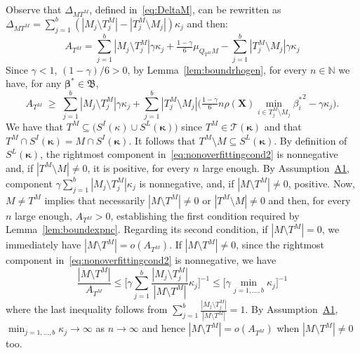 \documentclass[
  12pt]{article}
\newcommand{\N}{\mathbb{N}}
\newcommand{\T}{\mathcal{T}}
\newcommand{\bbeta}{\boldsymbol{\beta}}
\newcommand{\bX}{\mathbf{X}}
\newcommand{\bB}{\mathfrak{B}}
\newcommand{\bkappa}{\boldsymbol{\kappa}}
\begin{document}
Observe that $\Delta_{MT^M}$, defined in~\eqref{eq:DeltaM}, can be rewritten as $\Delta_{MT^M}=\sum_{j=1}^b(|M_j\setminus T^M_j|-|T^M_j\setminus M_j|)\kappa_j$ and then:
$$ A_{T^M}=\sum_{j=1}^b|M_j\setminus T^M_j|\gamma\kappa_j+\tfrac{1-\gamma}{6}\mu_{Q_{T^M}M}-\sum_{j=1}^b|T^M_j\setminus M_j|\gamma\kappa_j $$
Since $\gamma <1$, $(1-\gamma)/6 >0$, by  Lemma~\ref{lem:boundrhogen}, for every $n\in \N$ we have, for any $\bbeta^*\in \bB$,
\begin{equation}\label{eq:nonoverfittingcond2}
   A_{T^M}\;\geq\; \sum_{j=1}^b|M_j \setminus T^M_j|\gamma\kappa_j + \sum_{j=1}^b |T^M_j\setminus M_j |\Big(\tfrac{1-\gamma}{6} n \rho(\bX) \min_{i\in T^M_j\setminus M_j}{\beta^*_i}^{2} - \gamma\kappa_j\Big).
\end{equation} 
We have that $T^M\subseteq \big(S^I(\kappa) \cup S^L(\bkappa)\big)$ since $T^M\in\T(\bkappa)$ and that $T^M\cap S^{I}(\bkappa) = M\cap S^{I}(\bkappa)$. It follows that $T^M\setminus M \subseteq S^L(\bkappa)$. By definition of $S^L(\bkappa)$, the rightmost component in~\eqref{eq:nonoverfittingcond2} is nonnegative and, if $|T^M\setminus M|\neq0$, it is positive, for every $n$ large enough. By Assumption~\hyperlink{lab:A1}{A1}, component $\gamma\sum_{j=1}^b|M_j \setminus T^M_j|\kappa_j$ is nonnegative, and, if $|M\setminus T^M|\neq0$, positive. Now, $M\neq T^M$ implies that necessarily $|M\setminus T^M|\neq0$ or $|T^M\setminus M|\neq0$ and then, for every $n$ large enough, $A_{T^M}>0$, establishing the first condition required by Lemma~\ref{lem:boundexpnc}. Regarding its second condition, if $|M\setminus T^M|=0$, we immediately have $|M\setminus T^M|=o(A_{T^M})$. If $|M\setminus T^M|\neq 0$, since the rightmost component in~\eqref{eq:nonoverfittingcond2} is nonnegative, we have
$$\frac{|M\setminus T^M|}{A_{T^M}}\leq \bigg[ \gamma\sum_{j=1}^b\frac{|M_j \setminus T^M_j|}{|M\setminus T^M|}\kappa_j \bigg]^{-1} \leq \bigg[ \gamma\min_{j=1,\ldots,b}\kappa_j \bigg]^{-1} $$
where the last inequality follows from $\sum_{j=1}^b\frac{|M_j \setminus T^M_j|}{|M\setminus T^M|}=1$. By Assumption~\hyperlink{lab:A1}{A1}, $\min_{j=1,\ldots,b}\kappa_j\to \infty$ as $n\to\infty$ and hence $|M\setminus T^M|=o(A_{T^M})$ when $|M\setminus T^M|\neq 0$ too.
\end{document}
